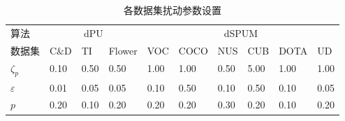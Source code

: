 \begin{table}[htbp]
    \caption{\label{char4:tab:perturb_reg}各数据集扰动参数设置}
    \begin{tabularx}{\textwidth}{XXXX||XXXXXX}
        \hline
        算法 & \multicolumn{3}{c}{dPU} & \multicolumn{6}{c}{dSPUM} \\  \cline{1-10}
        数据集 & C$\&$D & TI & Flower & VOC & COCO & NUS & CUB & DOTA & UD \\ \hline
        $\zeta_p$ 
               & 0.10 & 0.50 & 0.50 & 1.00 & 1.00 & 0.50 & 5.00 & 1.00 & 1.00\\
        $\varepsilon$
               & 0.01 & 0.05 & 0.05 & 0.10 & 0.50 & 0.10 & 0.50 & 0.10 & 0.05 \\
        $p$    & 0.20 & 0.10 & 0.20 & 0.20 & 0.20 & 0.30 & 0.20 & 0.10 & 0.20 \\ \hline
    \end{tabularx}
\end{table}

